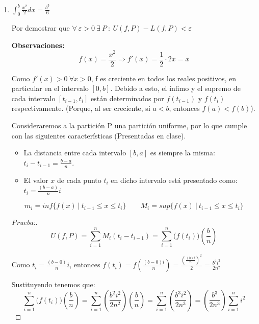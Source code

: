 \documentclass[12pt]{article}
\begin{document}
\begin{enumerate}[\hspace{9px} a)]
    \item \(\displaystyle\int_{0}^{b}\frac{x^2}{2}dx=\frac{b^3}{6}\)\medskip

        Por demostrar que \(\forall \ \varepsilon>0 \ \exists \ P \ : \ U(f,P)-L(f,P)<\varepsilon\)\medskip

        \textbf{Observaciones:}
        \[f(x)=\frac{x^2}{2} \Rightarrow f'(x)=\frac{1}{2}\cdot2x = x\]

        Como \(f'(x)>0 \ \forall x>0\), f es creciente en todos los reales positivos, en particular en el intervalo $[0,b]$. Debido a esto, el \'infimo y el supremo de cada intervalo \([t_{i-1},t_i]\) est\'an determinados por \(f(t_{i-1})\) y \(f(t_i)\) respectivamente. (Porque, al ser creciente, si $a<b$, entonces \(f(a)<f(b)\)).\medskip

        Consideraremos a la partici\'on P una partici\'on uniforme, por lo que cumple con las siguientes caracter\'isticas (Presentadas en clase).
        \begin{itemize}
            \item La distancia entre cada intervalo $[b,a]$ es siempre la misma: \(t_i-t_{i-1}=\displaystyle\frac{b-a}{n}\).
            \item El valor $x$ de cada punto $t_i$ en dicho intervalo est\'a presentado como: \(t_i=\displaystyle\frac{(b-a)}{n}i\)
        \end{itemize}

        \[m_i=inf\{f(x) \ | \ t_{i-1} \leq x \leq t_i\} \qquad M_i=sup\{f(x) \ | \ t_{i-1} \leq x \leq t_i\}\]

        \begin{proof}[Prueba:]
            \begin{equation*}%
                U(f,P)=\sum_{i=1}^n M_i(t_i-t_{i-1}) = \sum_{i=1}^n \big(f(t_i)\big)\left(\displaystyle\frac{b}{n}\right)
            \end{equation*}

            Como \(t_i=\displaystyle\frac{(b-0)}{n}i\), entonces \(f(t_i)=f\left(\displaystyle\frac{(b-0)i}{n}\right) = \frac{\left(\frac{(b)i}{n}\right)^2}{2} = \frac{b^2i^2}{2n^2}\)

            Sustituyendo tenemos que:
            \begin{equation*}
                \sum_{i=1}^n \big(f(t_i)\big)\left(\displaystyle\frac{b}{n}\right) = \sum_{i=1}^n \left(\frac{b^2i^2}{2n^2}\right)\left(\displaystyle\frac{b}{n}\right) = \sum_{i=1}^n \left(\frac{b^3i^2}{2n^3}\right) = \left(\frac{b^3}{2n^3}\right) \sum_{i=1}^n i^2
            \end{equation*}


\end{proof}
\end{enumerate}
\end{document}
